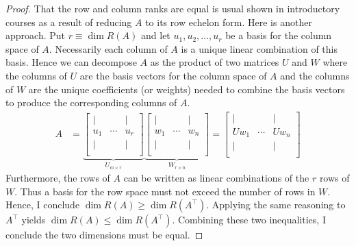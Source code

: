 \documentclass[]{article}
\theoremstyle{plain}
\theoremstyle{definition}
\theoremstyle{remark}
\begin{document}
\begin{proof}
That the row and column ranks are equal is usual shown in introductory courses
as a result of reducing $A$ to its row echelon form. Here is another approach.
Put $r \equiv \dim{R(A)}$ and let $u_1, u_2, \dots, u_r$ be a basis for the column
space of $A$.  Necessarily each column of $A$ is a unique linear combination of
this basis. Hence we can decompose $A$ as the product of two matrices $U$ and
$W$ where the columns of $U$ are the basis vectors for the column space of $A$
and the columns of $W$ are the unique coefficients (or weights) needed to combine
the basis vectors to produce the corresponding columns of $A$.
\begin{align*}
A &= \underbrace{\begin{bmatrix} | & & | \\
  u_1 & \cdots & u_r   \\
  | &  & | \\ 
\end{bmatrix}}_{U_{m \times r}}
\underbrace{\begin{bmatrix} | & & | \\
  w_1 & \cdots & w_n  \\
  | &  & | \\ 
\end{bmatrix}}_{W_{r \times n}}
 = \begin{bmatrix} | & & | \\
  Uw_1  & \cdots & Uw_n \\
  | &  & | \\ 
\end{bmatrix}
\end{align*}
Furthermore, the rows of $A$ can be written as linear combinations of the $r$ rows
of $W$.  Thus a basis for the row space must not exceed the number of rows in
$W$.  Hence, I conclude $\dim{R(A)} \ge \dim{R(A^\top)}$.  Applying the same
reasoning to $A^\top$ yields $\dim{R(A)} \le \dim{R(A^\top)}$.  Combining these
two inequalities, I conclude the two dimensions must be equal.


\end{proof}
\end{document}
